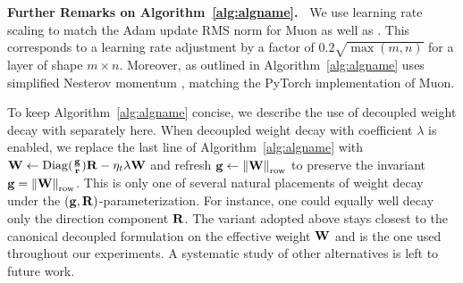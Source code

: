 
\textbf{Further Remarks on Algorithm~\ref{alg:algname}.\ } We use learning rate scaling to match the Adam update RMS norm \citep{liu_muon_2025} for Muon as well as \algname{}. This corresponds to a learning rate adjustment by a factor of $0.2 \sqrt{\max(m, n)}$ for a layer of shape $m \times n$. Moreover, \algname{} as outlined in Algorithm~\ref{alg:algname} uses simplified Nesterov momentum \citep{MethodSolvingConvex1983nesterov, bengio_2013_advances}, matching the PyTorch implementation of Muon. 

To keep Algorithm~\ref{alg:algname} concise, we describe the use of decoupled weight decay with \algname{} separately here. When decoupled weight decay with coefficient $\lambda$ is enabled, we replace the last line of Algorithm~\ref{alg:algname} with $\mathbf{W} \gets \mathrm{Diag}(\frac{\mathbf{g}}{\mathbf{r}}) \mathbf{R}- \eta_t\lambda \mathbf{W}$ and refresh $\mathbf{g} \gets \left \| \mathbf{W} \right\|_{\mathrm{row}}$ to preserve the invariant $\mathbf{g} = \left \| \mathbf{W} \right\|_{\mathrm{row}}$. This is only one of several natural placements of weight decay under the $(\mathbf{g}, \mathbf{R})$-parameterization. For instance, one could equally well decay only the direction component $\mathbf{R}$. The variant adopted above stays closest to the canonical decoupled formulation \citep{loshchilov_decoupled_2019} on the effective weight $\mathbf{W}$ and is the one used throughout our experiments. A systematic study of other alternatives is left to future work.
 
